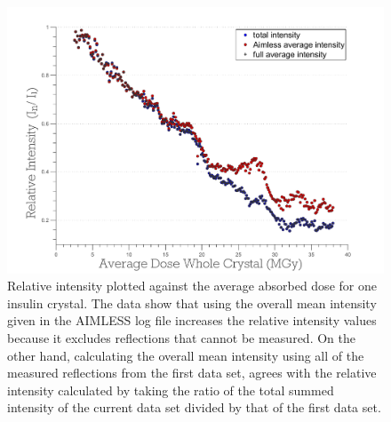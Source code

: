 \begin{figure}
  \centering
    \includegraphics[width=1.0\textwidth]{figures/dwd/calcrelint.pdf}
    \caption[Relative intensity plotted against the average absorbed dose for one insulin crystal.]{Relative intensity plotted against the average absorbed dose for one insulin crystal. The data show that using the overall mean intensity given in the AIMLESS log file increases the relative intensity values because it excludes reflections that cannot be measured. On the other hand, calculating the overall mean intensity using all of the measured reflections from the first data set, agrees with the relative intensity calculated by taking the ratio of the total summed intensity of the current data set divided by that of the first data set.}
    \label{figrelint}
\end{figure}
